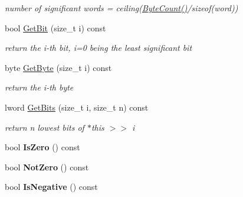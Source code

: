 \begin{DoxyCompactItemize}
\begin{DoxyCompactList}\small\item\em number of significant words = ceiling(\hyperlink{class_integer_aea4f2d31725ab02c67d9ea0288767670}{ByteCount()}/sizeof(word)) \item\end{DoxyCompactList}\item 
\hypertarget{class_integer_a2814c3b82849bd8f6f44cc36974f1717}{
bool \hyperlink{class_integer_a2814c3b82849bd8f6f44cc36974f1717}{GetBit} (size\_\-t i) const }
\label{class_integer_a2814c3b82849bd8f6f44cc36974f1717}

\begin{DoxyCompactList}\small\item\em return the i-\/th bit, i=0 being the least significant bit \item\end{DoxyCompactList}\item 
\hypertarget{class_integer_a95fad23b0d8a06325ca2893300c9b45e}{
byte \hyperlink{class_integer_a95fad23b0d8a06325ca2893300c9b45e}{GetByte} (size\_\-t i) const }
\label{class_integer_a95fad23b0d8a06325ca2893300c9b45e}

\begin{DoxyCompactList}\small\item\em return the i-\/th byte \item\end{DoxyCompactList}\item 
\hypertarget{class_integer_a66049970ba544ce8178f9c7d69776b23}{
lword \hyperlink{class_integer_a66049970ba544ce8178f9c7d69776b23}{GetBits} (size\_\-t i, size\_\-t n) const }
\label{class_integer_a66049970ba544ce8178f9c7d69776b23}

\begin{DoxyCompactList}\small\item\em return n lowest bits of $\ast$this $>$$>$ i \item\end{DoxyCompactList}\item 
\hypertarget{class_integer_a6d70dd43a65cfec05f5563daa43fd104}{
bool {\bfseries IsZero} () const }
\label{class_integer_a6d70dd43a65cfec05f5563daa43fd104}

\item 
\hypertarget{class_integer_a00b920fd1854a8a1a5be234edebfd8e2}{
bool {\bfseries NotZero} () const }
\label{class_integer_a00b920fd1854a8a1a5be234edebfd8e2}

\item 
\hypertarget{class_integer_a7118a72cd6ac315a17ebe03316f25186}{
bool {\bfseries IsNegative} () const }
\label{class_integer_a7118a72cd6ac315a17ebe03316f25186}


\end{DoxyCompactItemize}

